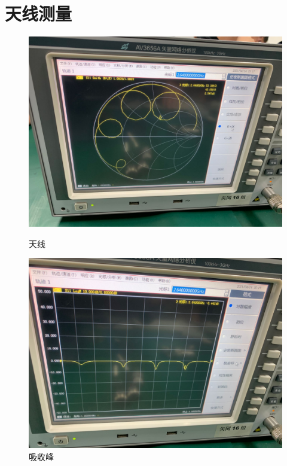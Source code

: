 \documentclass{../source/Experiment}
\begin{document}
\section{天线测量}
\begin{figure}[H]
    \centering
    \begin{minipage}[t]{0.3\textwidth}
        \centering
        \includegraphics[width=1\textwidth]{pic/天线}
        \caption{天线}
    \end{minipage}
    \begin{minipage}[t]{0.3\textwidth}
        \centering
        \includegraphics[width=1\textwidth]{pic/吸收峰}
        \caption{吸收峰}
    \end{minipage}
    \begin{minipage}[t]{0.3\textwidth}

\end{minipage}
\end{figure}
\end{document}
